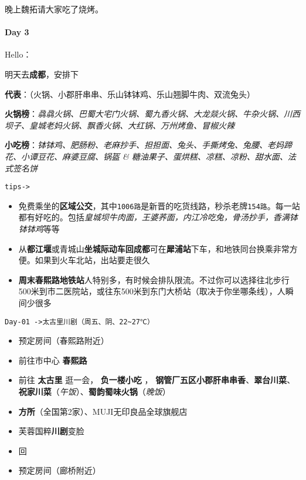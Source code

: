 \documentclass[UTF8,a4paper,8pt]{ctexart}
\begin{document}
	 	 晚上魏拓请大家吃了烧烤。
 	 \paragraph{Day 3       \quad     }
	 	 Hello：
	 	 
	 	 明天去\textbf{成都}，安排下
	 	 
	 	 \newpage
	 	 \textbf{代表}：（火锅、小郡肝串串、乐山钵钵鸡、乐山翘脚牛肉、双流兔头）
		 	 
		 \textbf{火锅榜}：\textit{骉骉火锅、巴蜀大宅门火锅、蜀九香火锅、大龙燚火锅、牛杂火锅、川西坝子、皇城老妈火锅、飘香火锅、大红锅、万州烤鱼、冒椒火辣}
		 
		 \textbf{小吃榜}：\textit{钵钵鸡、肥肠粉、老麻抄手、担担面、兔头、手撕烤兔、兔腰、老妈蹄花、小谭豆花、麻婆豆腐、锅盔 \& 糖油果子、蛋烘糕、凉糕、凉粉、甜水面、法式签名饼}
		 
		 \verb|tips-> |
			 \begin{itemize}[itemindent = 2em]
			 	\item  免费乘坐的\textbf{区域公交}，其中\verb|1006路|是新晋的吃货线路，秒杀老牌\verb|154路|。每一站都有好吃的。包括\textit{皇城坝牛肉面，王婆荞面，内江冷吃兔，骨汤抄手，香满钵钵钵鸡}等等
			 	\item  从\textbf{都江堰}或青城山\textbf{坐城际动车回成都}可在\textbf{犀浦站}下车，和地铁同台换乘非常方便。如果到火车北站，出站要走很久 
			 	\item  \textbf{周末春熙路地铁站}人特别多，有时候会排队限流。不过你可以选择往北步行500米到市二医院站，或往东500米到东门大桥站（取决于你坐哪条线），人瞬间少很多 
			 \end{itemize}
		 
		 	 \verb|Day-01 ->太古里川剧（周五、阴、22~27℃）|
		 	 \begin{itemize}[itemindent = 2em]
		 	 	\item 预定房间（春熙路附近）
		 	 	\item 前往市中心 \textbf{春熙路}
		 	 	\item 前往 \textbf{太古里} 逛一会， \textbf{负一楼小吃} ， \textbf{钢管厂五区小郡肝串串香}、\textbf{翠台川菜}、\textbf{祝家川菜}（\textit{午饭}）、\textbf{蜀韵蜀味火锅}（\textit{晚饭}）
		 	 	\item \textbf{方所}（全国第2家）、MUJI无印良品全球旗舰店
		 	 	\item 芙蓉国粹\textbf{川剧}变脸 	
		 	 	\item 回 	
		 	 	\item 预定房间（廊桥附近）
		 	 \end{itemize}
		 	 
\end{document}
